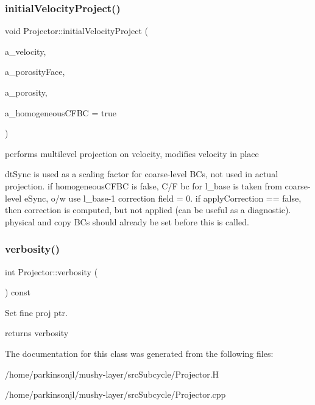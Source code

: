 \subsubsection{\texorpdfstring{initial\+Velocity\+Project()}{initialVelocityProject()}}
{\footnotesize\ttfamily void Projector\+::initial\+Velocity\+Project (\begin{DoxyParamCaption}\item[{\textbf{ Vector}$<$ \textbf{ Level\+Data}$<$ \textbf{ F\+Array\+Box} $>$ $\ast$ $>$ \&}]{a\+\_\+velocity,  }\item[{\textbf{ Vector}$<$ \textbf{ Ref\+Counted\+Ptr}$<$ \textbf{ Level\+Data}$<$ \textbf{ Flux\+Box} $>$ $>$ $>$ \&}]{a\+\_\+porosity\+Face,  }\item[{\textbf{ Vector}$<$ \textbf{ Ref\+Counted\+Ptr}$<$ \textbf{ Level\+Data}$<$ \textbf{ F\+Array\+Box} $>$ $>$ $>$ \&}]{a\+\_\+porosity,  }\item[{bool}]{a\+\_\+homogeneous\+C\+F\+BC = {\ttfamily true} }\end{DoxyParamCaption})}



performs multilevel projection on velocity, modifies velocity in place 

dt\+Sync is used as a scaling factor for coarse-\/level BC\textquotesingle{}s, not used in actual projection. if homogeneous\+C\+F\+BC is false, C/F bc for l\+\_\+base is taken from coarse-\/level e\+Sync, o/w use l\+\_\+base-\/1 correction field = 0. if apply\+Correction == false, then correction is computed, but not applied (can be useful as a diagnostic). physical and copy BC\textquotesingle{}s should already be set before this is called. \mbox{\label{class_projector_a4b633f9f7bf0f239e91050a577c0a29e}} 
\subsubsection{\texorpdfstring{verbosity()}{verbosity()}}
{\footnotesize\ttfamily int Projector\+::verbosity (\begin{DoxyParamCaption}{ }\end{DoxyParamCaption}) const}



Set fine proj ptr. 

returns verbosity 

The documentation for this class was generated from the following files\+:\begin{DoxyCompactItemize}
\item 
/home/parkinsonjl/mushy-\/layer/src\+Subcycle/Projector.\+H\item 
/home/parkinsonjl/mushy-\/layer/src\+Subcycle/Projector.\+cpp\end{DoxyCompactItemize}
